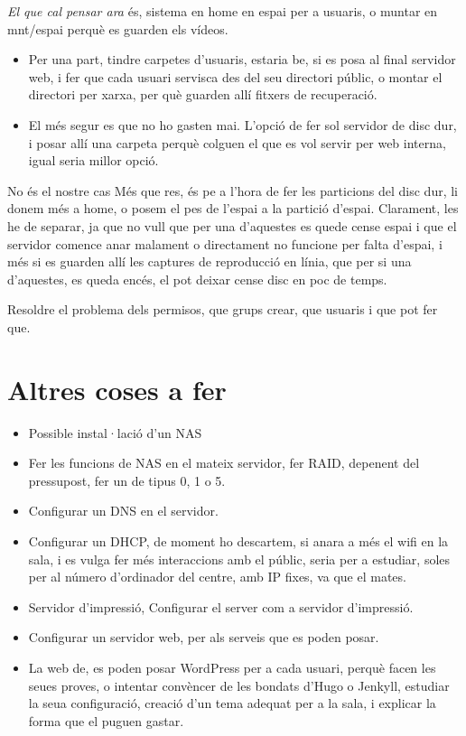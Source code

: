 \documentclass[
  10pt,
]{krantz}
\providecommand{\tightlist}{%
  \setlength{\itemsep}{0pt}\setlength{\parskip}{0pt}}
\begin{document}
\emph{El que cal pensar ara} és, sistema en home en espai per a usuaris, o muntar en mnt/espai perquè es guarden els vídeos.

\begin{itemize}
\tightlist
\item
  Per una part, tindre carpetes d'usuaris, estaria be, si es posa al final servidor web, i fer que cada usuari servisca des del seu directori públic, o montar el directori per xarxa, per què guarden allí fitxers de recuperació.
\item
  El més segur es que no ho gasten mai. L'opció de fer sol servidor de disc dur, i posar allí una carpeta perquè colguen el que es vol servir per web interna, igual seria millor opció.
\end{itemize}

\begin{rmdnote}{No és el nostre cas}
Més que res, és pe a l'hora de fer les particions del disc dur, li donem més a home, o posem el pes de l'espai a la partició d'espai. Clarament, les he de separar, ja que no vull que per una d'aquestes es quede cense espai i que el servidor comence anar malament o directament no funcione per falta d'espai, i més si es guarden allí les captures de reproducció en línia, que per si una d'aquestes, es queda encés, el pot deixar cense disc en poc de temps.

\end{rmdnote}

Resoldre el problema dels permisos, que grups crear, que usuaris i que pot fer que.

\hypertarget{altres-coses-a-fer}{%
\section{Altres coses a fer}\label{altres-coses-a-fer}}

\begin{itemize}
\item
  Possible instal·lació d'un NAS
\item
  Fer les funcions de NAS en el mateix servidor, fer RAID, depenent del pressupost, fer un de tipus 0, 1 o 5.
\item
  Configurar un DNS en el servidor.
\item
  Configurar un DHCP, de moment ho descartem, si anara a més el wifi en la sala, i es vulga fer més interaccions amb el públic, seria per a estudiar, soles per al número d'ordinador del centre, amb IP fixes, va que el mates.
\item
  Servidor d'impressió, Configurar el server com a servidor d'impressió.
\item
  Configurar un servidor web, per als serveis que es poden posar.
\item
  La web de, es poden posar WordPress per a cada usuari, perquè facen les seues proves, o intentar convèncer de les bondats d'Hugo o Jenkyll, estudiar la seua configuració, creació d'un tema adequat per a la sala, i explicar la forma que el puguen gastar.
\end{itemize}
\end{document}
